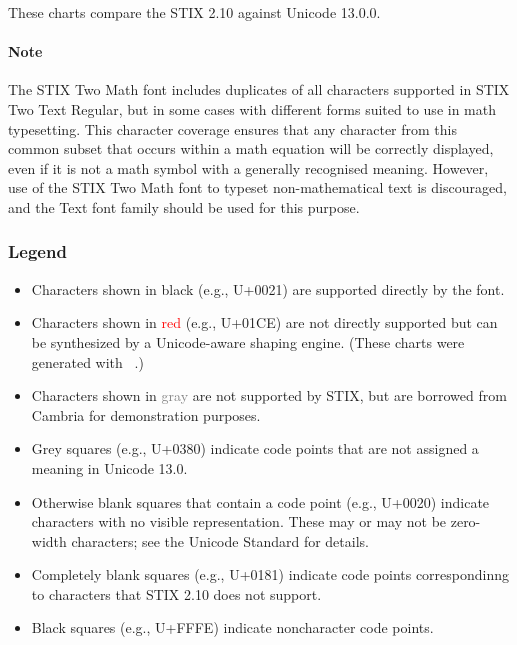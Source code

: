 
\noindent
These charts compare the STIX 2.10 against Unicode 13.0.0.

\ifSTIXMath

\paragraph{Note}

The STIX Two Math font includes duplicates of all characters supported
in STIX Two Text Regular, but in some cases with different forms
suited to use in math typesetting. This character coverage ensures
that any character from this common subset that occurs within a math
equation will be correctly displayed, even if it is not a math symbol
with a generally recognised meaning.  However, use of the STIX Two
Math font to typeset non-mathematical text is discouraged, and the
Text font family should be used for this purpose.

\fi

\subsubsection*{Legend}

\begin{itemize}

\item Characters shown in black (e.g., U+0021) are supported directly by
the font.

\item Characters shown in \textcolor{red}{red} (e.g., U+01CE) are not
  directly supported but can be synthesized by a Unicode-aware shaping
  engine.  (These charts were generated
  with \XeTeX\ \number\XeTeXversion\XeTeXrevision.)


\ifshowghosts
\item Characters shown in \textcolor{gray}{gray} are not supported by
  STIX, but are borrowed from Cambria for demonstration purposes.
\fi

\item Grey squares (e.g., U+0380) indicate code points that are not
    assigned a meaning in Unicode 13.0.

\item Otherwise blank squares that contain a code point (e.g., U+0020)
indicate characters with no visible representation.  These may or may
not be zero-width characters; see the Unicode Standard for details.

\item Completely blank squares (e.g., U+0181) indicate code points
  correspondinng to characters that STIX 2.10 does not support.

\item Black squares (e.g., U+FFFE) indicate noncharacter code points.

\end{itemize}


